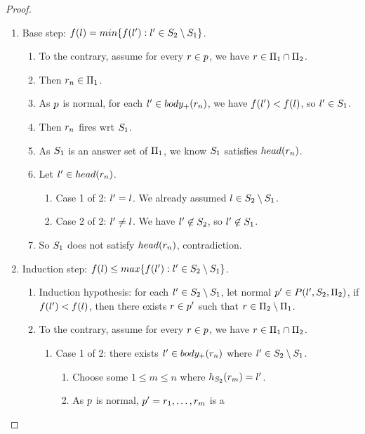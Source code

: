 \documentclass{paper}
\begin{document}
\begin{flushleft}
\begin{proof}
\begin{enumerate}

\item
Base step: $f(l) = min\{f({l}') :
{l}' \in {S}_{2} \setminus {S}_{1}\}$.
\begin{enumerate}
\item
To the contrary, assume for every $r \in p$, we have
$r \in {\Pi}_{1} \cap {\Pi}_{2}$.
\item
Then ${r}_{n} \in {\Pi}_{1}$.
\item
As $p$ is normal, for each
${l}' \in body_+({r}_{n})$,
we have $f({l}') < f(l)$,
so ${l}' \in {S}_{1}$.
\item
Then ${r}_{n}$ fires wrt ${S}_{1}$.
\item
As ${S}_{1}$ is an answer set of ${\Pi}_{1}$, we know
${S}_{1}$ satisfies $head({r}_{n})$.
\item
Let ${l}' \in head({r}_{n})$.
\begin{enumerate}
\item
Case 1 of 2: ${l}' = l$.
We already assumed $l \in {S}_{2} \setminus {S}_{1}$.
\item
Case 2 of 2: ${l}' \ne l$.
We have ${l}' \not\in {S}_{2}$,
so ${l}' \not\in {S}_{1}$.
\end{enumerate}
\item
So ${S}_{1}$ does not satisfy $head({r}_{n})$,
contradiction.
\end{enumerate}
\item
Induction step: $f(l) \le max\{f({l}') :
{l}' \in {S}_{2} \setminus {S}_{1}\}$.
\begin{enumerate}
\item
Induction hypothesis: for each
${l}' \in {S}_{2} \setminus {S}_{1}$,
let normal ${p}' \in P({{l}'}, {{S}_{2}}, {{\Pi}_{2}})$,
if $f({l}') < f(l)$,
then there exists ${r} \in {p}'$
such that ${r} \in {\Pi}_{2} \setminus {\Pi}_{1}$.
\item
To the contrary, assume for every $r \in p$, we have
$r \in {\Pi}_{1} \cap {\Pi}_{2}$.
\begin{enumerate}
\item
Case 1 of 2: there exists ${l}' \in body_+({r}_{n})$
where ${l}' \in {S}_{2} \setminus {S}_{1}$.
\begin{enumerate}
\item
Choose some $1 \le m \le n$ where
$h_{{S}_{2}}({r}_{m}) = {l}'$.
\item
As $p$ is normal, ${p}' = {r}_{1}, \ldots, {r}_{m}$ is a

\end{enumerate}
\end{enumerate}
\end{enumerate}
\end{enumerate}
\end{proof}
\end{flushleft}
\end{document}
